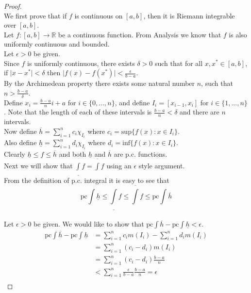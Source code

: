 \documentclass[12pt]{article}
\begin{document}
	\begin{proof}  \text{ }\\
		We first prove that if $f$ is continuous on $[a,b]$, then it is Riemann integrable over $[a,b]$. \\
		
		Let $f : [a,b] \to \mathbb{R}$ be a continuous function. From Analysis we know that $f$ is also uniformly continuous and bounded.\\
		Let $\epsilon > 0$ be given. \\
		Since $f$ is uniformly continuous, there exists $ \delta >0$ such that for all $x,x^* \in [a,b]$, if $\vert x - x^* \vert < \delta$ then $\vert f(x) - f(x^*) \vert < \frac{\epsilon}{b-a}$.\\
		By the Archimedean property there exists some natural number $n$, such that $n > \frac{b-a}{\delta}$. \\
		Define $x_i = \frac{b-a}{n} i+ a$ for $i \in \{0,...,n\}$, and define $I_i = [x_{i-1}, x_i]$ for $i \in \{1,...,n\}$. Note that the length of each of these intervals is $\frac{b-a}{n} < \delta$ and there are $n$ intervals. \\
		Now define $\overline{h} = \sum\limits_{i=1}^n c_i \chi_{I_i}$ where $c_i = \text{sup} \{f(x) : x \in I_i\}$. \\
		Also define $\underline{h} = \sum\limits_{i=1}^n d_i \chi_{I_i}$ where $d_i = \text{inf} \{f(x) : x \in I_i\}$. \\
		Clearly $\underline{h} \leq f \leq \overline{h}$ and both $\underline{h}$ and $\overline{h}$ are p.c. functions.\\
		
		Next we will show that $\underline{\int}f = \overline{\int}f$ using an $\epsilon$ style argument. \\
		
		From the definition of p.c. integral it is easy to see that $$\text{pc}\int\underline{h} \leq \underline{\int}f \leq \overline{\int}f \leq \text{pc}\int \overline{h}$$ \\
		Let $\epsilon > 0$ be given. We would like to show that $\text{pc}\int\overline{h} - \text{pc}\int \underline{h} < \epsilon$.\\
		\begin{align*}
			\text{pc}\int\overline{h} - \text{pc}\int\underline{h} & = \sum\limits_{i=1}^n c_i m(I_i) - \sum\limits_{i=1}^n d_i m(I_i) \\
			& = \sum\limits_{i=1}^n (c_i - d_i) m(I_i)\\
			& = \sum\limits_{i=1}^n (c_i - d_i) \frac{b-a}{n}\\
			& < \sum\limits_{i=1}^n \frac{\epsilon}{b-a} \frac{b-a}{n} = \epsilon\\
		\end{align*}
		

\end{proof}
\end{document}
